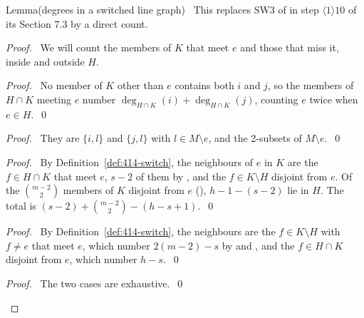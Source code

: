 \begin{namedresult}{Lemma}{(degrees in a switched line graph)}\label{lem:414-degree}
 \new\ This replaces SW3 of  in step $\langle1\rangle10$ of its
 Section 7.3 by a direct count.
\end{namedresult}
\begin{proof}
 \pfsketch\ We will count the members of $K$ that meet $e$ and those that miss it, inside and
 outside $H$.
 \begin{proof}\pf\ No member of $K$ other than $e$ contains both $i$ and $j$, so the members of
  $H\cap K$ meeting $e$ number $\deg_{H\cap K}(i)+\deg_{H\cap K}(j)$, counting $e$ twice when
  $e\in H$.~\qed\end{proof}
 \begin{proof}\pf\ They are $\{i,l\}$ and $\{j,l\}$ with $l\in M\setminus e$, and the 2-subsets
  of $M\setminus e$.~\qed\end{proof}
 \begin{proof}\pf\ By Definition~\ref{def:414-switch}, the neighbours of $e$ in $K$ are the
  $f\in H\cap K$ that meet $e$, $s-2$ of them by , and the $f\in K\setminus H$
  disjoint from $e$. Of the $\binom{m-2}2$ members of $K$ disjoint from $e$
  (), $h-1-(s-2)$ lie in $H$. The total is
  $(s-2)+\binom{m-2}2-(h-s+1)$.~\qed\end{proof}
 \begin{proof}\pf\ By Definition~\ref{def:414-switch}, the neighbours are the $f\in K\setminus H$
  with $f\ne e$ that meet $e$, which number $2(m-2)-s$ by  and
  , and the $f\in H\cap K$ disjoint from $e$, which number
  $h-s$.~\qed\end{proof}
 \qedstep
 \begin{proof}\pf\ The two cases are exhaustive.~\qed\end{proof}
\end{proof}

